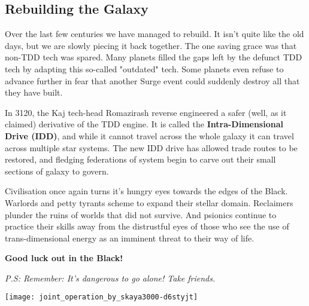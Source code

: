 \begin{multicols}{2}
  \subsection{Rebuilding the Galaxy}

  Over the last few centuries we have managed to rebuild. It isn't quite like the old days, but we are slowly piecing it back together. The one saving grace was that non-TDD tech was spared. Many planets filled the gaps left by the defunct TDD tech by adapting this so-called "outdated" tech. Some planets even refuse to advance further in fear that another Surge event could suddenly destroy all that they have built.
  
  In 3120, the Kaj tech-head Romazirash reverse engineered a safer (well, as it claimed) derivative of the TDD engine. It is called the \textbf{Intra-Dimensional Drive (IDD)}, and while it cannot travel across the whole galaxy it can travel across multiple star systems. The new IDD drive has allowed trade routes to be restored, and fledging federations of system begin to carve out their small sections of galaxy to govern. 
  
  Civilisation once again turns it's hungry eyes towards the edges of the Black. Warlords and petty tyrants scheme to expand their stellar domain. Reclaimers plunder the ruins of worlds that did not survive. And psionics continue to practice their skills away from the distrustful eyes of those who see the use of trans-dimensional energy as an imminent threat to their way of life.

  \textbf{Good luck out in the Black!}
  
  \textit{P.S: Remember: It's dangerous to go alone! Take friends.}
\end{multicols}

\vspace{\baselineskip}

\texttt{[image: joint\_operation\_by\_skaya3000-d6styjt]}
